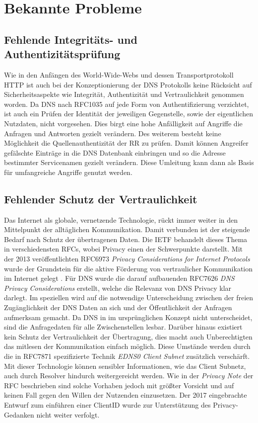 \chapter{Bekannte Probleme}
\label{chap:threads}

\section{Fehlende Integritäts- und Authentizitätsprüfung}
\label{sec:Thread-Auth}

Wie in den Anfängen des World-Wide-Webs und dessen Transportprotokoll HTTP ist auch bei der Konzeptionierung der DNS Protokolls keine Rücksicht auf Sicherheitsaspekte wie Integrität, Authentizität und Vertraulichkeit genommen worden. Da DNS nach RFC1035\cite{rfc1035} auf jede Form von Authentifizierung verzichtet, ist auch ein Prüfen der Identität der jeweiligen Gegenstelle, sowie der eigentlichen Nutzdaten, nicht vorgesehen. Dies birgt eine hohe Anfälligkeit auf Angriffe die Anfragen und Antworten gezielt verändern. Des weiterem besteht keine Möglichkeit die Quellenauthentizität der RR zu prüfen. Damit können Angreifer gefälschte Einträge in die DNS Datenbank einbringen und so die Adresse bestimmter Servicenamen gezielt verändern. Diese Umleitung kann dann als Basis für umfangreiche Angriffe genutzt werden.

\section{Fehlender Schutz der Vertraulichkeit}
\label{sec:Thread-Priv}

Das Internet als globale, vernetzende Technologie, rückt immer weiter in den Mittelpunkt der alltäglichen Kommunikation. Damit verbunden ist der steigende Bedarf nach Schutz der übertragenen Daten. Die IETF behandelt dieses Thema in verschiedensten RFCs, wobei Privacy einen der Schwerpunkte darstellt. Mit der 2013 veröffentlichten RFC6973 \textit{Privacy Considerations for Internet Protocols}\cite{rfc6973} wurde der Grundstein für die aktive Förderung von vertraulicher Kommunikation im Internet gelegt . 
Für DNS wurde die darauf aufbauenden RFC7626 \textit{DNS Privacy Considerations}\cite{rfc7626} erstellt, welche die Relevanz von DNS Privacy klar darlegt. Im speziellen wird auf die notwendige Unterscheidung zwischen der freien Zugänglichkeit der DNS Daten an sich und der Öffentlichkeit der Anfragen aufmerksam gemacht. Da DNS in im ursprünglichen Konzept nicht unterscheidet, sind die Anfragedaten für alle Zwischenstellen lesbar. Darüber hinaus existiert kein Schutz der Vertraulichkeit der Übertragung, dies macht auch Unberechtigten das mitlesen der Kommunikation einfach möglich. 
Diese Umstände werden durch die in RFC7871\cite{RFC7871} spezifizierte Technik \textit{EDNS0 Client Subnet} zusätzlich verschärft. Mit dieser Technologie können sensibler Informationen, wie das Client Subnetz, auch durch Resolver hindurch weitergereicht werden. Wie in der \textit{Privacy Note} der RFC beschrieben sind solche Vorhaben jedoch mit größter Vorsicht und auf keinen Fall gegen den Willen der Nutzenden einzusetzen. Der 2017 eingebrachte Entwurf zum einführen einer ClientID\cite{Licht2017} wurde zur Unterstützung des Privacy-Gedanken nicht weiter verfolgt.

